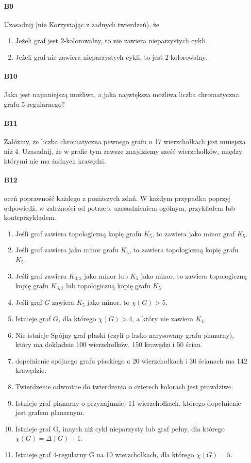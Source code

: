 \documentclass[a4paper,12pt]{article}
\theoremstyle{definition}%
\theoremstyle{definition}
\theoremstyle{problem}
\begin{document}
\paragraph{B9} Uzasadnij (nie Korzystając z żadnych twierdzeń), że
\begin{enumerate}[label=\alph*)]
\item Jeżeli graf jest 2-kolorowalny, to nie zawiera nieparzystych cykli.
\item Jeżeli graf nie zawiera nieparzystych cykli, to jest 2-kolorowalny.
\end{enumerate}

\paragraph{B10} Jaka jest najmniejszą możliwa, a jaka największa możliwa liczba chromatyczna grafu 5-regularnego?

\paragraph{B11} Załóżmy, że liczba chromatyczna pewnego grafu o 17 wierzchołkach jest mniejsza niż 4. Uzasadnij, że w grafie tym zawsze znajdziemy sześć wierzchołków, między którymi nie ma żadnych krawędzi.

\paragraph{B12} oceń poprawność każdego z poniższych zdań. W każdym przypadku poprzyj odpowiedź, w zależności od potrzeb, uzasadnieniem ogólnym, przykładem lub kontrprzykładem.
\begin{enumerate}[label=\alph*)]
\item Jeśli graf zawiera topologiczną kopię grafu $K_5$, to zawiera jako minor graf $K_5$.
\item Jeśli graf zawiera jako minor grafu $K_5$, to zawiera topologiczną kopię grafu $K_5$.
\item Jeśli graf zawiera $K_{3,3}$ jako minor lub $K_5$ jako minor, to zawiera topologiczną kopię grafu $K_{3,3}$ lub topologiczną kopię grafu $K_5$.
\item Jeśli graf $G$ zawiera $K_5$ jako minor, to $\chi (G) > 5$.
\item Istnieje graf $G$, dla którego $\chi (G) > 4$, a który nie zawiera $K_4$.
\item Nie istnieje Spójny graf płaski (czyli p lasko narysowany grafu planarny), który ma dokładnie 100 wierzchołków, 150 krawędzi i 50 ścian.
\item dopełnienie spójnego grafu płaskiego o 20 wierzchołkach i 30 ścianach ma 142 krawędzie.
\item Twierdzenie odwrotne do twierdzenia o czterech kolorach jest prawdziwe.
\item Istnieje graf planarny o przynajmniej 11 wierzchołkach, którego dopełnienie jest grafem planarnym.
\item Istnieje graf G, innych niż cykl nieparzysty lub graf pełny, dla którego $\chi (G) = \Delta (G) + 1$.
\item Istnieje graf 4-regularny G na 10 wierzchołkach, dla którego $\chi (G) = 5$.
\end{enumerate}
\end{document}
